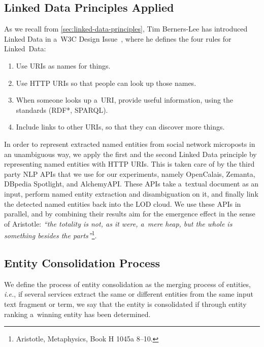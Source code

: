 \subsection{Linked Data Principles Applied}

As we recall from \autoref{sec:linked-data-principles}, 
Tim Berners-Lee has introduced Linked Data in a~W3C
Design Issue~\cite{bernerslee2006linkeddata},
where he defines the four rules for Linked~Data:

\begin{enumerate}
  \item Use URIs as names for things.
  \item Use HTTP URIs so that people can look up those names.
  \item When someone looks up a~URI, provide useful information, 
        using the standards (RDF*, SPARQL).
  \item Include links to other URIs, so that they can discover
        more things.
\end{enumerate}

In order to represent extracted named entities from
social network microposts in an unambiguous way,
we apply the first and the second Linked Data principle
by representing named entities with HTTP URIs.
This is taken care of by the third party NLP APIs
that we use for our experiments, namely OpenCalais,
Zemanta, DBpedia Spotlight, and AlchemyAPI.
These APIs take a~textual document as an input,
perform named entity extraction and disambiguation on it,
and finally link the detected named entities back
into the LOD cloud.
We use these APIs in parallel, and by combining their results
aim for the emergence effect in the sense of Aristotle:
\textit{``the totality is not, as it were, a~mere heap,
but the whole is something besides the
parts''}\footnote{Aristotle, Metaphysics, Book H 1045a 8--10.}.

\subsection{Entity Consolidation Process}
We define the process of entity consolidation as the merging process of entities, \emph{i.e.}, if several services extract the same or different
entities from the same input text fragment or term, we say that the entity is consolidated if through entity ranking a~winning entity has been determined.

